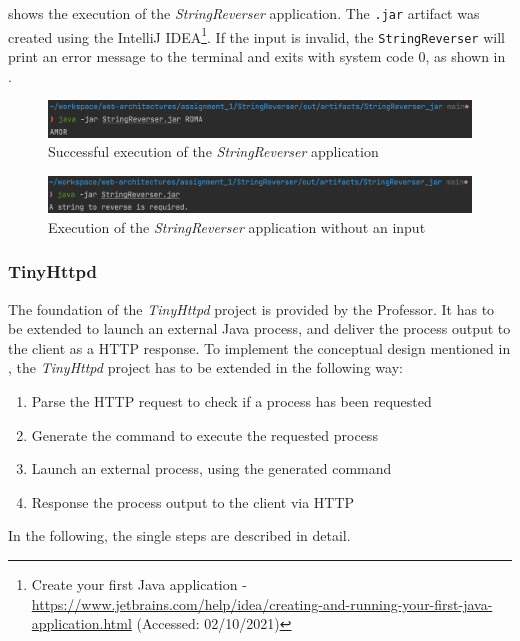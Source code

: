  shows the execution of the \textit{StringReverser} application. The \texttt{.jar} artifact was created using the IntelliJ IDEA\footnote{Create your first Java application - \url{https://www.jetbrains.com/help/idea/creating-and-running-your-first-java-application.html} (Accessed: 02/10/2021)}.
If the input is invalid, the \texttt{StringReverser} will print an error message to the terminal and exits with system code 0, as shown in .

\begin{figure}[h]
\centering
\includegraphics[scale=0.4]{images/StringReverserExec}
\caption{Successful execution of the \textit{StringReverser} application}
\label{fig:01_part1_impl_stringreverser_execution}
\end{figure}

\begin{figure}[h]
\centering
\includegraphics[scale=0.4]{images/StringReverserExecFail}
\caption{Execution of the \textit{StringReverser} application without an input}
\label{fig:01_part1_impl_stringreverser_execution_fail}
\end{figure}

\subsubsection{TinyHttpd}
The foundation of the \textit{TinyHttpd} project is provided by the Professor. It has to be extended to launch an external Java process, and deliver the process output to the client as a HTTP response.
To implement the conceptual design mentioned in , the \textit{TinyHttpd} project has to be extended in the following way:
\begin{enumerate}
\item Parse the HTTP request to check if a process has been requested
\item Generate the command to execute the requested process
\item Launch an external process, using the generated command
\item Response the process output to the client via HTTP
\end{enumerate}
In the following, the single steps are described in detail.


